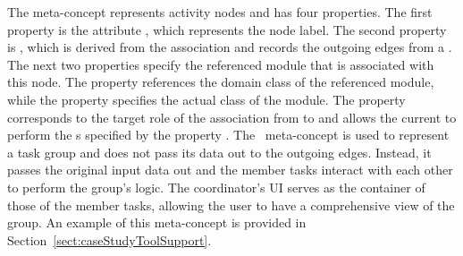 The  meta-concept represents activity nodes and has four properties. The first property is the attribute , which represents the node label. The second property is , which is derived from the association  and records the outgoing edges from a . The next two properties specify the referenced module that is associated with this node. The  property references the domain class of the referenced module, while the  property specifies the actual  class of the module. The  property corresponds to the target role of the association from  to  and allows the current  to perform the s specified by the property . The~ meta-concept is used to represent a task group and does not pass its data out to the outgoing edges. Instead, it passes the original input data out and the member tasks interact with each other to perform the group's logic. The coordinator's UI serves as the container of those of the member tasks, allowing the user to have a comprehensive view of the group. An example of this meta-concept is provided in Section~\ref{sect:caseStudyToolSupport}.

